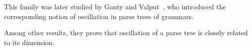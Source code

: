 \documentclass[runningheads]{llncs}
\begin{document}
This family was later studied by Ganty and Valput~\cite{BoundOsc},
who introduced the corresponding notion of oscillation in parse trees of grammars.
%

%
Among other results, they
prove that oscillation of a parse tree is closely related to its dimension.
\end{document}
